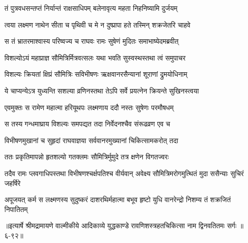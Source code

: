 \twolineshloka
{तं पुत्रवधसन्तप्तं निर्यान्तं राक्षसाधिपम्}
{बलेनावृत्य महता निहनिष्यामि दुर्जयम्} %

\twolineshloka
{त्वया लक्ष्मण नाथेन सीता च पृथिवी च मे}
{न दुष्प्रापा हते तस्मिन् शक्रजेतरि चाहवे} %

\twolineshloka
{स तं भ्रातरमाश्वास्य परिष्वज्य च राघवः}
{रामः सुषेणं मुदितः समाभाष्येदमब्रवीत्} %

\twolineshloka
{विशल्योऽयं महाप्राज्ञ सौमित्रिर्मित्रवत्सलः}
{यथा भवति सुस्वस्थस्तथा त्वं समुपाचर} %

\twolineshloka
{विशल्यः क्रियतां क्षिप्रं सौमित्रिः सविभीषणः}
{ऋक्षवानरसैन्यानां शूराणां द्रुमयोधिनाम्} %

\twolineshloka
{ये चाप्यन्येऽत्र युध्यन्ति सशल्या व्रणिनस्तथा}
{तेऽपि सर्वे प्रयत्नेन क्रियन्ते सुखिनस्त्वया} %

\twolineshloka
{एवमुक्तः स रामेण महात्मा हरियूथपः}
{लक्ष्मणाय ददौ नस्तः सुषेणः परमौषधम्} %

\twolineshloka
{स तस्य गन्धमाघ्राय विशल्यः समपद्यत}
{तदा निर्वेदनश्चैव संरूढव्रण एव च} %

\twolineshloka
{विभीषणमुखानां च सुहृदां राघवाज्ञया}
{सर्ववानरमुख्यानां चिकित्सामकरोत् तदा} %

\twolineshloka
{ततः प्रकृतिमापन्नो हृतशल्यो गतक्लमः}
{सौमित्रिर्मुमुदे तत्र क्षणेन विगतज्वरः} %

\twolineshloka
{तदैव रामः प्लवगाधिपस्तथा विभीषणश्चर्क्षपतिश्च वीर्यवान्}
{अवेक्ष्य सौमित्रिमरोगमुत्थितं मुदा ससैन्याः सुचिरं जहर्षिरे} %

\twolineshloka
{अपूजयत् कर्म स लक्ष्मणस्य सुदुष्करं दाशरथिर्महात्मा}
{बभूव हृष्टो युधि वानरेन्द्रो निशम्य तं शक्रजितं निपातितम्} %


॥इत्यार्षे श्रीमद्रामायणे वाल्मीकीये आदिकाव्ये युद्धकाण्डे रावणिशस्त्रहतचिकित्सा नाम द्विनवतितमः सर्गः ॥६-९२॥
